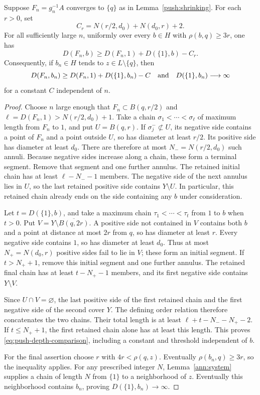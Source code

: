 \begin{lemma}\label{push:depth-comparison}
Suppose $F_n=g_n^{-1}A$ converges to $\{q\}$ as in
Lemma~\ref{push:shrinking}.  For each $r>0$, set
\[
 C_r=N(r/2,d_0)+N(d_0,r)+2.
\]
For all sufficiently large $n$, uniformly over every $b\in H$ with
$\rho(b,q)\ge3r$, one has
\begin{equation}\label{eq:push-depth-comparison}
 D(F_n,b)\ge D(F_n,1)+D(\{1\},b)-C_r.
\end{equation}
Consequently, if $b_n\in H$ tends to $z\in L\setminus\{q\}$, then
\[
 D(F_n,b_n)\ge D(F_n,1)+D(\{1\},b_n)-C
 \quad\hbox{and}\quad D(\{1\},b_n)\longrightarrow\infty
\]
for a constant $C$ independent of $n$.
\end{lemma}
\begin{proof}
Choose $n$ large enough that
$F_n\subset B(q,r/2)$ and
$\ell=D(F_n,1)>N(r/2,d_0)+1$.  Take a chain
$\sigma_1<\cdots<\sigma_\ell$ of maximum length from $F_n$ to $1$,
and put $U=B(q,r)$.
If $\sigma_j^-\not\subset U$, its negative side contains a point of
$F_n$ and a point outside $U$, so has diameter at least $r/2$.
Its positive side has diameter at least $d_0$.
There are therefore at most $N_-=N(r/2,d_0)$ such annuli.
Because negative sides increase along a chain, these form a terminal
segment.  Remove that segment and one further annulus.
The retained initial chain has at least $\ell-N_--1$ members.
The negative side of the next annulus lies in $U$, so the last retained
positive side contains $Y\setminus U$.
In particular, this retained chain already ends on the side containing
any $b$ under consideration.

Let $t=D(\{1\},b)$, and take a maximum chain
$\tau_1<\cdots<\tau_t$ from $1$ to $b$ when $t>0$.
Put $V=Y\setminus\overline{B(q,2r)}$.
A positive side not contained in $V$ contains both $b$ and a point at
distance at most $2r$ from $q$, so has diameter at least $r$.
Every negative side contains $1$, so has diameter at least $d_0$.
Thus at most $N_+=N(d_0,r)$ positive sides fail to lie in $V$;
these form an initial segment.
If $t>N_++1$, remove this initial segment and one further annulus.
The retained final chain has at least $t-N_+-1$ members, and its first
negative side contains $Y\setminus V$.

Since $U\cap V=\varnothing$, the last positive side of the first retained
chain and the first negative side of the second cover $Y$.
The defining order relation therefore concatenates the two chains.
Their total length is at least $\ell+t-N_--N_+-2$.
If $t\le N_++1$, the first retained chain alone has at least this length.
This proves \eqref{eq:push-depth-comparison}, including a constant and
threshold independent of $b$.

For the final assertion choose $r$ with $4r<\rho(q,z)$.
Eventually $\rho(b_n,q)\ge3r$, so the inequality applies.
For any prescribed integer $N$, Lemma~\ref{ann:system} supplies a chain
of length $N$ from $\{1\}$ to a neighborhood of $z$.
Eventually this neighborhood contains $b_n$, proving
$D(\{1\},b_n)\to\infty$.
\end{proof}

